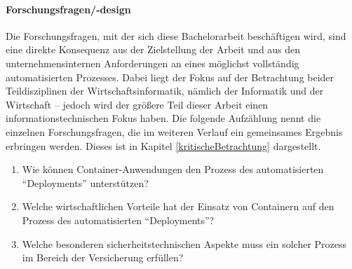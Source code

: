 \paragraph{Forschungsfragen/-design}\label{ffs}
Die Forschungsfragen, mit der sich diese Bachelorarbeit beschäftigen wird, sind eine direkte Konsequenz aus der Zielstellung der Arbeit und aus den unternehmensinternen Anforderungen an eines möglichst vollständig automatisierten Prozesses. Dabei liegt der Fokus auf der Betrachtung beider Teildisziplinen der Wirtschaftsinformatik, nämlich der Informatik und der Wirtschaft -- jedoch wird der größere Teil dieser Arbeit einen informationstechnischen Fokus haben. Die folgende Aufzählung nennt die einzelnen Forschungsfragen, die im weiteren Verlauf ein gemeinsames Ergebnis erbringen werden. Dieses ist in Kapitel \vref{kritischeBetrachtung} dargestellt.
\begin{enumerate}
	\item Wie können Container-Anwendungen den Prozess des automatisierten \enquote{Deployments} unterstützen?
	\item Welche wirtschaftlichen Vorteile hat der Einsatz von Containern auf den Prozess des automatisierten \enquote{Deployments}?
	\item Welche besonderen sicherheitstechnischen Aspekte muss ein solcher Prozess im Bereich der Versicherung erfüllen?
\end{enumerate}

